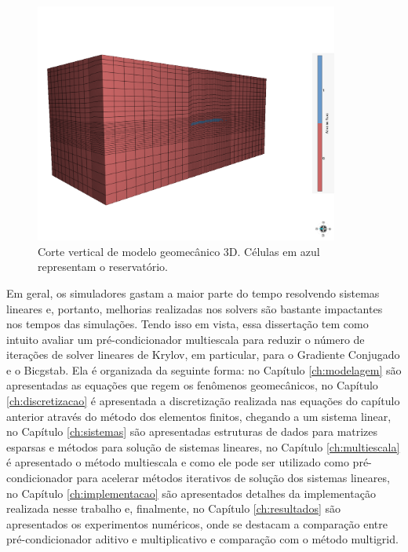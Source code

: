 \begin{figure}[!htbp]
\centering
\includegraphics[width=10cm]{chap00/figs/Geresim(0054).png}
\caption{Corte vertical de modelo geomecânico 3D. Células em azul representam o reservatório.}
\label{fig:modelogeomec3d}
\end{figure}

Em geral, os simuladores gastam a maior parte do tempo resolvendo sistemas lineares e, portanto, melhorias realizadas nos solvers são bastante impactantes nos tempos das simulações. Tendo isso em vista, essa dissertação tem como intuito avaliar um pré-condicionador multiescala para reduzir o número de iterações de solver lineares de Krylov, em particular, para o Gradiente Conjugado e o Bicgstab. Ela é organizada da seguinte forma: no Capítulo \ref{ch:modelagem} são apresentadas as equações que regem os fenômenos geomecânicos, no Capítulo \ref{ch:discretizacao} é apresentada a discretização realizada nas equações do capítulo anterior através do método dos elementos finitos, chegando a um sistema linear, no Capítulo \ref{ch:sistemas} são apresentadas estruturas de dados para matrizes esparsas e métodos para solução de sistemas lineares, no Capítulo \ref{ch:multiescala} é apresentado o método multiescala e como ele pode ser utilizado como pré-condicionador para acelerar métodos iterativos de solução dos sistemas lineares, no Capítulo \ref{ch:implementacao} são apresentados detalhes da implementação realizada nesse trabalho e, finalmente, no Capítulo \ref{ch:resultados} são apresentados os experimentos numéricos, onde se destacam a comparação entre pré-condicionador aditivo e multiplicativo e comparação com o método multigrid. 




